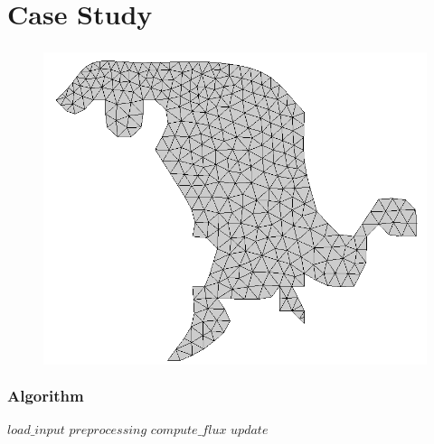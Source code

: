 \section{Case Study}

\begin{frame}[plain]
	\frametitle{\polu}
	\begin{figure}
		\centering
		\begin{columns}
				\includegraphics[width=\textwidth]{images/foz_msh.png}
				\pause

				\vfill
				\vfill
		\end{columns}
	\end{figure}
\end{frame}

\begin{frame}
	\frametitle{Algorithm}

	\begin{algorithmic}
		\State $load\_input$
		\State $preprocessing$
			\State $compute\_flux$
			\State $update$
		\EndWhile
	\end{algorithmic}
\end{frame}
